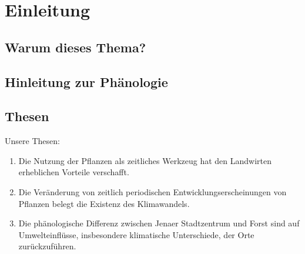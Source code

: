 \chapter{Einleitung}


\section{Warum dieses Thema?}
\section{Hinleitung zur Phänologie}
\section{Thesen}
Unsere Thesen:
\begin{enumerate}
    


    \item Die Nutzung der Pflanzen als zeitliches
    Werkzeug hat den Landwirten erheblichen 
    Vorteile verschafft.
    

    \item Die Veränderung von zeitlich periodischen 
    Entwicklungserscheinungen von Pflanzen belegt 
    die Existenz des Klimawandels. 



    \item Die phänologische Differenz zwischen Jenaer Stadtzentrum und Forst sind auf Umwelteinflüsse, insbesondere klimatische Unterschiede, der Orte zurückzuführen. 
\end{enumerate}

